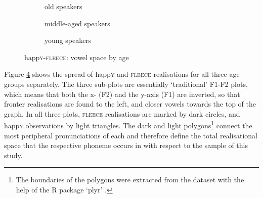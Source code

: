 \begin{figure}[h!]
	\centering
	\begin{subfigure}{.49\textwidth}
		\centering
			\resizebox{\linewidth}{!}{} 
		\caption{old speakers}
		\label{fig.happy.space.old}
	\end{subfigure}
	
	\begin{subfigure}{.49\textwidth}
		\centering
			\resizebox{\linewidth}{!}{} 
		\caption{middle-aged speakers}
		\label{fig.happy.space.mid}
	\end{subfigure}
	\begin{subfigure}{.49\textwidth}
		\centering
			\resizebox{\linewidth}{!}{} 
		\caption{young speakers}
		\label{fig.happy.space.young}
	\end{subfigure}
	\caption{happ\textsc{y}-\textsc{fleece}: vowel space by age}
	\label{fig.happy.space}
\end{figure}

Figure \ref{fig.happy.space} shows the spread of happ\textsc{y} and \textsc{fleece} realisations for all three age groups separately.
The three sub-plots are essentially `traditional' F1-F2  plots, which means that both the x- (F2) and the y-axis (F1) are inverted, so that fronter realisations are found to the left, and closer vowels towards the top of the graph.
In all three plots, \textsc{fleece} realisations are marked by dark circles, and happ\textsc{y} observations by light triangles.
The dark and light polygons\footnote{The boundaries of the polygons were extracted from the dataset with the help of the R package `plyr' \parencite{plyr}.} connect the most peripheral pronunciations of each  and therefore define the total realisational space that the respective phoneme occurs in with respect to the sample of this study.

